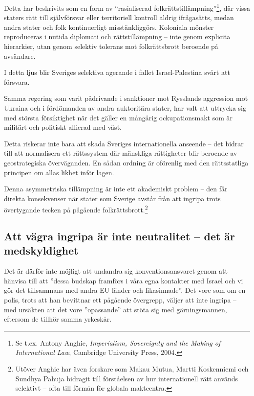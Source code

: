 \documentclass[12pt]{article}
\begin{document}
Detta har beskrivits som en form av “rasialiserad folkrättstillämpning”\footnote{Se t.ex. Antony Anghie, \textit{Imperialism, Sovereignty and the Making of International Law}, Cambridge University Press, 2004.}, där vissa staters rätt till självförsvar eller territoriell kontroll aldrig ifrågasätts, medan andra stater och folk kontinuerligt misstänkliggörs. Koloniala mönster reproduceras i nutida diplomati och rättstillämpning – inte genom explicita hierarkier, utan genom selektiv tolerans mot folkrättsbrott beroende på avsändare.

I detta ljus blir Sveriges selektiva agerande i fallet Israel-Palestina svårt att försvara.

Samma regering som varit pådrivande i sanktioner mot Rysslands aggression mot Ukraina och i fördömanden av andra auktoritära stater, har valt att uttrycka sig med största försiktighet när det gäller en mångårig ockupationsmakt som är militärt och politiskt allierad med väst. 

Detta riskerar inte bara att skada Sveriges internationella anseende – det bidrar till att normalisera ett rättssystem där mänskliga rättigheter blir beroende av geostrategiska överväganden. En sådan ordning är oförenlig med den rättsstatliga principen om allas likhet inför lagen.



\vspace{1em}

Denna asymmetriska tillämpning är inte ett akademiskt problem – den får direkta konsekvenser när stater som Sverige avstår från att ingripa trots övertygande tecken på pågående folkrättsbrott.\footnote{Utöver Anghie har även forskare som Makau Mutua, Martti Koskenniemi och Sundhya Pahuja bidragit till förståelsen av hur internationell rätt används selektivt – ofta till förmån för globala maktcentra.}





\subsection*{Att vägra ingripa är inte neutralitet – det är medskyldighet}

Det är därför inte möjligt att undandra sig konventionsansvaret genom att hänvisa till att ”dessa budskap framförs i våra egna kontakter med Israel och vi gör det tillsammans med andra EU-länder och likasinnade”.  
Det vore som om en polis, trots att han bevittnar ett pågående övergrepp, väljer att inte ingripa – med ursäkten att det vore ”opassande” att stöta sig med gärningsmannen, eftersom de tillhör samma yrkeskår.
\end{document}
